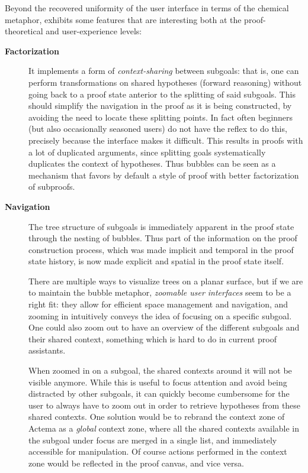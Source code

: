 Beyond the recovered uniformity of the user interface in terms of the chemical
metaphor,  exhibits some features that are interesting both at the
proof-theoretical and user-experience levels:
\begin{description}
  \item[\textbf{Factorization}] It implements a form of \emph{context-sharing}
    between subgoals: that is, one can perform transformations on shared
    hypotheses (forward reasoning) without going back to a proof state anterior
    to the splitting of said subgoals. This should simplify the navigation in
    the proof as it is being constructed, by avoiding the need to locate these
    splitting points. In fact often beginners (but also occasionally seasoned
    users) do not have the reflex to do this, precisely because the interface
    makes it difficult. This results in proofs with a lot of duplicated
    arguments, since splitting goals systematically duplicates the context of
    hypotheses. Thus bubbles can be seen as a mechanism that favors by default a
    style of proof with better factorization of subproofs.

  \item[\textbf{Navigation}] The tree structure of subgoals is immediately
    apparent in the proof state through the nesting of bubbles. Thus part of the
    information on the proof construction process, which was made implicit and
    temporal in the proof state history, is now made explicit and spatial in the
    proof state itself.
    
    There are multiple ways to visualize trees on a planar surface, but if we
    are to maintain the bubble metaphor, \emph{zoomable user interfaces} seem to
    be a right fit: they allow for efficient space management and navigation,
    and zooming in intuitively conveys the idea of focusing on a specific
    subgoal. One could also zoom out to have an overview of the different
    subgoals and their shared context, something which is hard to do in current
    proof assistants.
    
    When zoomed in on a subgoal, the shared contexts around it will not be
    visible anymore. While this is useful to focus attention and avoid being
    distracted by other subgoals, it can quickly become cumbersome for the user
    to always have to zoom out in order to retrieve hypotheses from these shared
    contexts. One solution would be to rebrand the context zone of Actema as a
    \emph{global} context zone, where all the shared contexts available in the
    subgoal under focus are merged in a single list, and immediately accessible
    for manipulation. Of course actions performed in the context zone would be
    reflected in the proof canvas, and vice versa.


\end{description}
